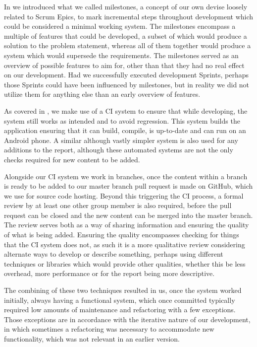In  we introduced what we called milestones, a concept of our own devise loosely related to Scrum Epics, to mark incremental steps throughout development which could be considered a minimal working system.
The milestones encompass a multiple of features that could be developed, a subset of which would produce a solution to the problem statement, whereas all of them together would produce a system which would supersede the requirements.
The milestones served as an overview of possible features to aim for, other than that they had no real effect on our development.
Had we successfully executed development Sprints, perhaps those Sprints could have been influenced by milestones, but in reality we did not utilize them for anything else than an early overview of features.

\bigskip
As covered in , we make use of a \ac{CI} system to ensure that while developing, the system still works as intended and to avoid regression.
This system builds the application ensuring that it can build, compile, is up-to-date and can run on an Android phone.
A similar although vastly simpler system is also used for any additions to the report, although these automated systems are not the only checks required for new content to be added.

Alongside our \ac{CI} system we work in branches, once the content within a branch is ready to be added to our master branch pull request is made on GitHub, which we use for source code hosting.
Beyond this triggering the \ac{CI} process, a formal review by at least one other group member is also required, before the pull request can be closed and the new content can be merged into the master branch.
The review serves both as a way of sharing information and ensuring the quality of what is being added.
Ensuring the quality encompasses checking for things that the \ac{CI} system does not, as such it is a more qualitative review considering alternate ways to develop or describe something, perhaps using different techniques or libraries which would provide other qualities, whether this be less overhead, more performance or for the report being more descriptive.

The combining of these two techniques resulted in us, once the system worked initially, always having a functional system, which once committed typically required low amounts of maintenance and refactoring with a few exceptions.
Those exceptions are in accordance with the iterative nature of our development, in which sometimes a refactoring was necessary to accommodate new functionality, which was not relevant in an earlier version.


